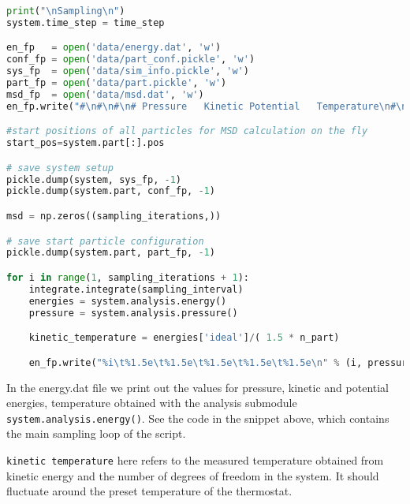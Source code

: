 \documentclass[
paper=a4,                       %
fontsize=11pt,                  %
twoside,                        %
footsepline,                    %
headsepline,                    %
headinclude=false,              %
footinclude=false,              %
pagesize,                       %
]{scrartcl}
\newtheorem{task}{Task}
\begin{document}
{\small\vspace{0,2cm}
\begin{lstlisting}[language=Python]
print("\nSampling\n")
system.time_step = time_step

en_fp   = open('data/energy.dat', 'w')
conf_fp = open('data/part_conf.pickle', 'w')
sys_fp  = open('data/sim_info.pickle', 'w')
part_fp = open('data/part.pickle', 'w')
msd_fp  = open('data/msd.dat', 'w')
en_fp.write("#\n#\n#\n# Pressure   Kinetic Potential   Temperature\n#\n")

#start positions of all particles for MSD calculation on the fly
start_pos=system.part[:].pos

# save system setup
pickle.dump(system, sys_fp, -1)
pickle.dump(system.part, conf_fp, -1)

msd = np.zeros((sampling_iterations,))

# save start particle configuration
pickle.dump(system.part, part_fp, -1)

for i in range(1, sampling_iterations + 1):
    integrate.integrate(sampling_interval)
    energies = system.analysis.energy()
    pressure = system.analysis.pressure()

    kinetic_temperature = energies['ideal']/( 1.5 * n_part)

    en_fp.write("%i\t%1.5e\t%1.5e\t%1.5e\t%1.5e\t%1.5e\n" % (i, pressure['total'], energies['total'], energies['ideal'], energies['total'] - energies['ideal'], kinetic_temperature))
\end{lstlisting}}\vspace{0,2cm}


In the energy.dat file we print out the values for pressure, kinetic
and potential energies, temperature obtained with the analysis submodule
\lstinline|system.analysis.energy()|. See the code in the snippet above, which
contains the main sampling loop of the script.


\noindent \texttt{kinetic temperature} here refers to the measured temperature
obtained from kinetic energy and the number of degrees of freedom in the system. It
should fluctuate around the preset temperature of the thermostat.

\newpage
\vspace{1cm}\vspace{1cm}
\end{document}
